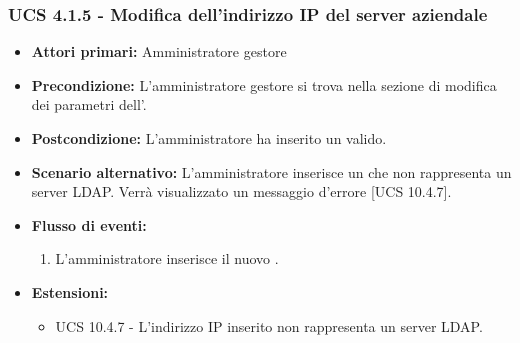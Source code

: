 \subsubsection{UCS 4.1.5 - Modifica dell'indirizzo IP del server aziendale}
\begin{itemize}
\item \textbf{Attori primari:} Amministratore gestore
\item \textbf{Precondizione:} L'amministratore gestore si trova nella sezione di modifica dei parametri dell'.
\item \textbf{Postcondizione:} L'amministratore ha inserito un  valido.
\item \textbf{Scenario alternativo:} L'amministratore inserisce un  che non rappresenta un server LDAP. Verrà visualizzato un messaggio d'errore [UCS 10.4.7].
\item \textbf{Flusso di eventi:}
\begin{enumerate}
    \item L'amministratore inserisce il nuovo .
\end{enumerate}
\item \textbf{Estensioni:}
\begin{itemize}
    \item UCS 10.4.7 - L'indirizzo IP inserito non rappresenta un server LDAP.
\end{itemize}
\end{itemize}




